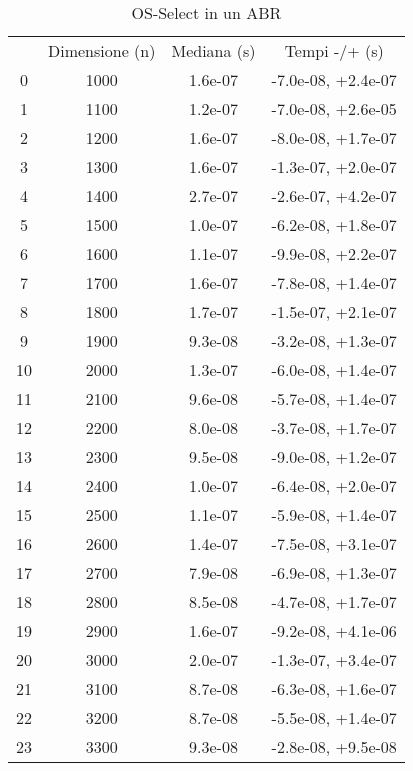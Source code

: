\begin{table}
\centering
\caption{OS-Select in un ABR}
\label{OS-Select in un ABR}
\begin{adjustbox}{width=1\textwidth/2}
\begin{tabular}{|c|c|c|c|}
\hline
 & Dimensione (n) & Mediana (s) & Tempi -/+ (s) \\
0 & 1000 & 1.6e-07 & -7.0e-08, +2.4e-07 \\
\cline{1-4}
1 & 1100 & 1.2e-07 & -7.0e-08, +2.6e-05 \\
\cline{1-4}
2 & 1200 & 1.6e-07 & -8.0e-08, +1.7e-07 \\
\cline{1-4}
3 & 1300 & 1.6e-07 & -1.3e-07, +2.0e-07 \\
\cline{1-4}
4 & 1400 & 2.7e-07 & -2.6e-07, +4.2e-07 \\
\cline{1-4}
5 & 1500 & 1.0e-07 & -6.2e-08, +1.8e-07 \\
\cline{1-4}
6 & 1600 & 1.1e-07 & -9.9e-08, +2.2e-07 \\
\cline{1-4}
7 & 1700 & 1.6e-07 & -7.8e-08, +1.4e-07 \\
\cline{1-4}
8 & 1800 & 1.7e-07 & -1.5e-07, +2.1e-07 \\
\cline{1-4}
9 & 1900 & 9.3e-08 & -3.2e-08, +1.3e-07 \\
\cline{1-4}
10 & 2000 & 1.3e-07 & -6.0e-08, +1.4e-07 \\
\cline{1-4}
11 & 2100 & 9.6e-08 & -5.7e-08, +1.4e-07 \\
\cline{1-4}
12 & 2200 & 8.0e-08 & -3.7e-08, +1.7e-07 \\
\cline{1-4}
13 & 2300 & 9.5e-08 & -9.0e-08, +1.2e-07 \\
\cline{1-4}
14 & 2400 & 1.0e-07 & -6.4e-08, +2.0e-07 \\
\cline{1-4}
15 & 2500 & 1.1e-07 & -5.9e-08, +1.4e-07 \\
\cline{1-4}
16 & 2600 & 1.4e-07 & -7.5e-08, +3.1e-07 \\
\cline{1-4}
17 & 2700 & 7.9e-08 & -6.9e-08, +1.3e-07 \\
\cline{1-4}
18 & 2800 & 8.5e-08 & -4.7e-08, +1.7e-07 \\
\cline{1-4}
19 & 2900 & 1.6e-07 & -9.2e-08, +4.1e-06 \\
\cline{1-4}
20 & 3000 & 2.0e-07 & -1.3e-07, +3.4e-07 \\
\cline{1-4}
21 & 3100 & 8.7e-08 & -6.3e-08, +1.6e-07 \\
\cline{1-4}
22 & 3200 & 8.7e-08 & -5.5e-08, +1.4e-07 \\
\cline{1-4}
23 & 3300 & 9.3e-08 & -2.8e-08, +9.5e-08 \\

\end{tabular}
\end{adjustbox}
\end{table}
